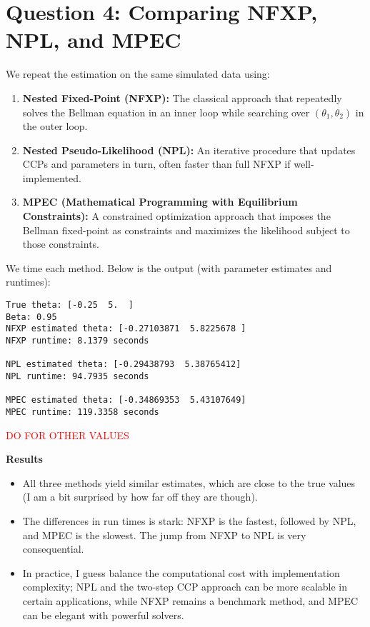 \documentclass[12pt]{article}
\begin{document}
\section{Question 4: Comparing NFXP, NPL, and MPEC}
We repeat the estimation on the same simulated data using:
\begin{enumerate}
\item \textbf{Nested Fixed-Point (NFXP):} 
   The classical approach that repeatedly solves the Bellman equation in an inner loop while searching over $(\theta_1,\theta_2)$ in the outer loop.
\item \textbf{Nested Pseudo-Likelihood (NPL):} 
   An iterative procedure that updates CCPs and parameters in turn, often faster than full NFXP if well-implemented.
\item \textbf{MPEC (Mathematical Programming with Equilibrium Constraints):}
   A constrained optimization approach that imposes the Bellman fixed-point as constraints and maximizes the likelihood subject to those constraints.
\end{enumerate}

We time each method. Below is the output (with parameter estimates and runtimes):

\begin{verbatim}
True theta: [-0.25  5.  ]
Beta: 0.95
NFXP estimated theta: [-0.27103871  5.8225678 ]
NFXP runtime: 8.1379 seconds

NPL estimated theta: [-0.29438793  5.38765412]
NPL runtime: 94.7935 seconds

MPEC estimated theta: [-0.34869353  5.43107649]
MPEC runtime: 119.3358 seconds
\end{verbatim}

\textcolor{red}{DO FOR OTHER VALUES}


\noindent\textbf{Results}
\begin{itemize}
\item All three methods yield similar estimates, which are close to the true values (I am a bit surprised by how far off they are though).
\item The differences in run times is stark: NFXP is the fastest, followed by NPL, and MPEC is the slowest. The jump from NFXP to NPL is very consequential.
\item In practice, I guess balance the computational cost with implementation complexity; NPL and the two-step CCP approach can be more scalable in certain applications, while NFXP remains a benchmark method, and MPEC can be elegant with powerful solvers.
\end{itemize}
\end{document}
